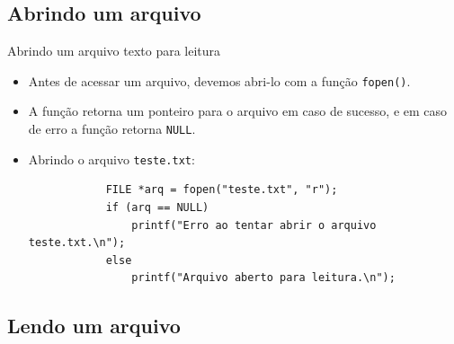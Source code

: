 \documentclass[handout]{beamer}
\begin{document}
\subsection{Abrindo um arquivo}

\begin{frame}[fragile]{Abrindo um arquivo texto para leitura}
    \begin{itemize}
        \item Antes de acessar um arquivo, devemos abri-lo com a função
        \texttt{fopen()}.
        \item A função retorna um ponteiro para o arquivo em
        caso de sucesso, e em caso de erro a função retorna \texttt{NULL}.

        \item Abrindo o arquivo \texttt{teste.txt}:
        \begin{verbatim}
            FILE *arq = fopen("teste.txt", "r");
            if (arq == NULL)
                printf("Erro ao tentar abrir o arquivo teste.txt.\n");
            else
                printf("Arquivo aberto para leitura.\n");
        \end{verbatim}
    \end{itemize}

\end{frame}

\subsection{Lendo um arquivo}
\end{document}
